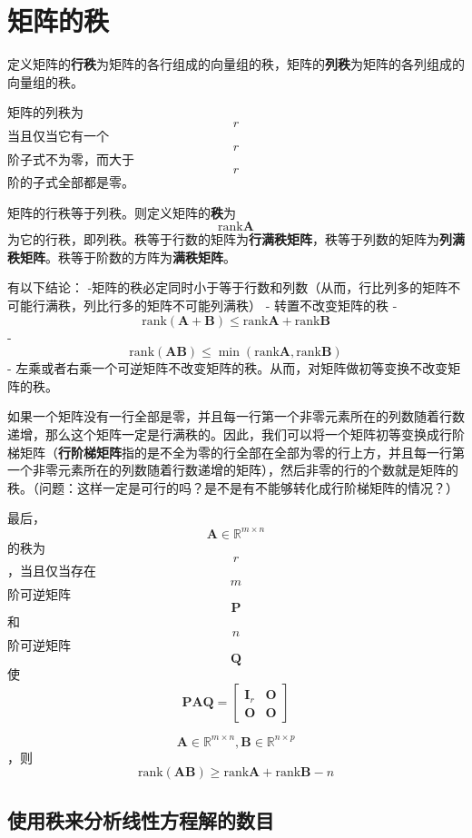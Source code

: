 \hypertarget{ux77e9ux9635ux7684ux79e9}{%
\section{矩阵的秩}\label{ux77e9ux9635ux7684ux79e9}}

定义矩阵的\textbf{行秩}为矩阵的各行组成的向量组的秩，矩阵的\textbf{列秩}为矩阵的各列组成的向量组的秩。

矩阵的列秩为$$r$$当且仅当它有一个$$r$$阶子式不为零，而大于$$r$$阶的子式全部都是零。

矩阵的行秩等于列秩。则定义矩阵的\textbf{秩}为$$\mathrm{rank} \boldsymbol{A}$$为它的行秩，即列秩。秩等于行数的矩阵为\textbf{行满秩矩阵}，秩等于列数的矩阵为\textbf{列满秩矩阵}。秩等于阶数的方阵为\textbf{满秩矩阵}。

有以下结论： 
-矩阵的秩必定同时小于等于行数和列数（从而，行比列多的矩阵不可能行满秩，列比行多的矩阵不可能列满秩）
- 转置不改变矩阵的秩 -
$$\mathrm{rank} (\boldsymbol{A} + \boldsymbol{B}) \leq \mathrm{rank} \boldsymbol{A} + \mathrm{rank} \boldsymbol{B}$$
-
$$\mathrm{rank} (\boldsymbol{A} \boldsymbol{B}) \leq \min (\mathrm{rank} \boldsymbol{A}, \mathrm{rank} \boldsymbol{B})$$
-
左乘或者右乘一个可逆矩阵不改变矩阵的秩。从而，对矩阵做初等变换不改变矩阵的秩。

如果一个矩阵没有一行全部是零，并且每一行第一个非零元素所在的列数随着行数递增，那么这个矩阵一定是行满秩的。因此，我们可以将一个矩阵初等变换成行阶梯矩阵（\textbf{行阶梯矩阵}指的是不全为零的行全部在全部为零的行上方，并且每一行第一个非零元素所在的列数随着行数递增的矩阵），然后非零的行的个数就是矩阵的秩。（问题：这样一定是可行的吗？是不是有不能够转化成行阶梯矩阵的情况？）

最后，$$\boldsymbol{A}\in \mathbb{R}^{m\times n}$$的秩为$$r$$，当且仅当存在$$m$$阶可逆矩阵$$\boldsymbol{P}$$和$$n$$阶可逆矩阵$$\boldsymbol{Q}$$使
\[
\boldsymbol{P} \boldsymbol{A} \boldsymbol{Q} = \left[
    \begin{matrix}
        \boldsymbol{I}_r & \boldsymbol{O} \\
        \boldsymbol{O} & \boldsymbol{O}
    \end{matrix}
\right]
\]

$$\boldsymbol{A} \in \mathbb{R}^{m\times n}, \boldsymbol{B} \in \mathbb{R}^{n \times p}$$，则
\[
\mathrm{rank} (\boldsymbol{A} \boldsymbol{B}) \geq \mathrm{rank}\boldsymbol{A} + \mathrm{rank}\boldsymbol{B} - n
\]

\hypertarget{ux4f7fux7528ux79e9ux6765ux5206ux6790ux7ebfux6027ux65b9ux7a0bux89e3ux7684ux6570ux76ee}{%
\subsection{使用秩来分析线性方程解的数目}\label{ux4f7fux7528ux79e9ux6765ux5206ux6790ux7ebfux6027ux65b9ux7a0bux89e3ux7684ux6570ux76ee}}

